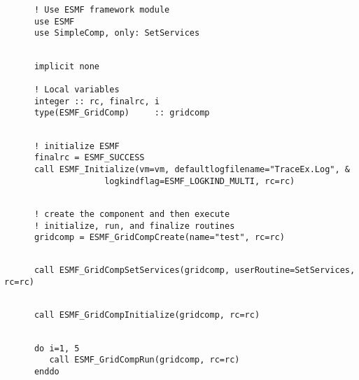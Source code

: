  \begin{verbatim}
      ! Use ESMF framework module
      use ESMF
      use SimpleComp, only: SetServices
 
\end{verbatim}
 

 \begin{verbatim}
      implicit none

      ! Local variables  
      integer :: rc, finalrc, i
      type(ESMF_GridComp)     :: gridcomp
 
\end{verbatim}
 

 \begin{verbatim}
      ! initialize ESMF
      finalrc = ESMF_SUCCESS
      call ESMF_Initialize(vm=vm, defaultlogfilename="TraceEx.Log", &
                    logkindflag=ESMF_LOGKIND_MULTI, rc=rc)
 
\end{verbatim}
 

 \begin{verbatim}
      ! create the component and then execute
      ! initialize, run, and finalize routines
      gridcomp = ESMF_GridCompCreate(name="test", rc=rc)
 
\end{verbatim}
 

 \begin{verbatim}
      call ESMF_GridCompSetServices(gridcomp, userRoutine=SetServices, rc=rc)
 
\end{verbatim}
 

 \begin{verbatim}
      call ESMF_GridCompInitialize(gridcomp, rc=rc)
 
\end{verbatim}
 

 \begin{verbatim}
      do i=1, 5
         call ESMF_GridCompRun(gridcomp, rc=rc)
      enddo
 
\end{verbatim}
 
